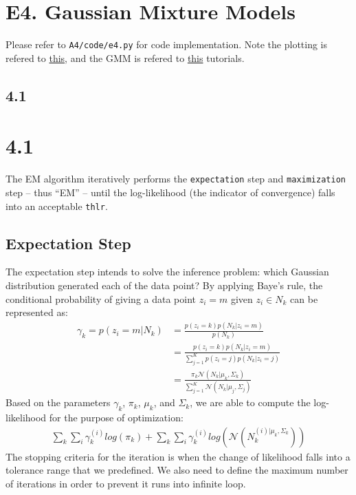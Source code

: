 \documentclass[11pt]{article}
\newcommand{\ilc}{\texttt}
\begin{document}
\section*{E4. Gaussian Mixture Models }

Please refer to \ilc{A4/code/e4.py} for code implementation. Note the plotting is refered to \href{https://matplotlib.org/3.2.2/gallery/statistics/confidence_ellipse.html#sphx-glr-gallery-statistics-confidence-ellipse-py}{this}, and the GMM is refered to \href{http://ethen8181.github.io/machine-learning/clustering/GMM/GMM.html#Parameter-Estimation}{this} tutorials.

\subsection*{4.1}

\section{4.1}
The EM algorithm iteratively performs the \ilc{expectation} step and \ilc{maximization} step -- thus ``EM'' -- until the log-likelihood (the indicator of convergence) falls into an acceptable \ilc{thlr}.


\subsection*{Expectation Step}

The expectation step intends to solve the inference problem: which Gaussian distribution generated each of the data point?
By applying Baye's rule, the conditional probability of giving a data point $z_i = m$ given $z_i \in N_k$ can be represented as:
\begin{align*}
    \gamma_k = p(z_i=m|N_k) &= \frac{p(z_i=k)p(N_k|z_i=m)}{p(N_k)} \\
    &= \frac{p(z_i=k)p(N_k|z_i=m)}{\sum_{j=1}^Kp(z_i=j)p(N_k|z_i=j)} \\
    &= \frac{\pi_k\mathcal N(N_k|\mu_k, \Sigma_k)}{\sum_{j=1}^K \mathcal N(N_k|\mu_j, \Sigma_j)}
\end{align*}
Based on the parameters $\gamma_k$, $\pi_k$, $\mu_k$, and $\Sigma_k$, we are able to compute the log-likelihood for the purpose of optimization:
\begin{align*}
    \sum_k\sum_i \gamma_k^{(i)}log(\pi_k) + \sum_k\sum_i \gamma_{k}^{(i)}log(\mathcal N(N_k^{(i)|\mu_k, \Sigma_k}))
\end{align*}
The stopping criteria for the iteration is when the change of likelihood falls into a tolerance range that we predefined. We also need to define the
maximum number of iterations in order to prevent it runs into infinite loop.
\end{document}
